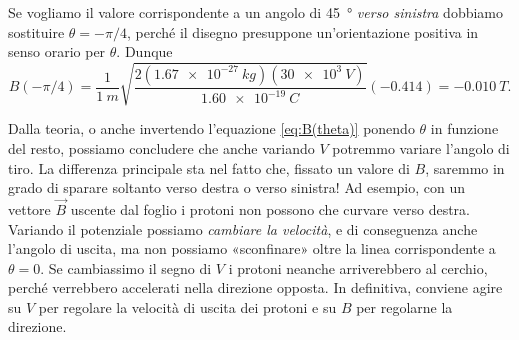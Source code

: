 \documentclass[10pt]{gulartcl}
\begin{document}
\begin{solution}
Se vogliamo il valore corrispondente a un angolo di \qty{45}{\degree}
\emph{verso sinistra} dobbiamo so\-sti\-tu\-i\-re $\theta = -\pi / 4$, perché il
disegno presuppone un’orientazione positiva in senso orario per $\theta$.
Dunque
\begin{equation}
    B(-\pi / 4) = \frac{1}{\qty{1}{m}} \sqrt{\frac{2 (\qty{1.67e-27}{kg})
    (\qty{30e3}{V})}{\qty{1.60e-19}{C}}} (-\num{0.414}) = \qty{-0.010}{T}.
\end{equation}

Dalla teoria, o anche invertendo l’equazione \eqref{eq:B(theta)} ponendo
$\theta$ in funzione del resto, possiamo concludere che anche variando $V$
potremmo variare l’angolo di tiro. La differenza principale sta nel fatto
che, fissato un valore di $B$, saremmo in grado di sparare soltanto verso
destra o verso sinistra! Ad esempio, con un vettore $\vec{B}$ uscente dal foglio i
protoni non possono che curvare verso destra. Variando il potenziale
possiamo \emph{cambiare la velocità}, e di conseguenza anche l’angolo di
uscita, ma non possiamo «sconfinare» oltre la linea corrispondente a
$\theta = 0$. Se cambiassimo il segno di $V$ i protoni neanche
arriverebbero al cerchio, perché verrebbero accelerati nella direzione
opposta. In definitiva, conviene agire su $V$ per regolare la velocità di
uscita dei protoni e su $B$ per regolarne la direzione. 
\end{solution}
\end{document}
